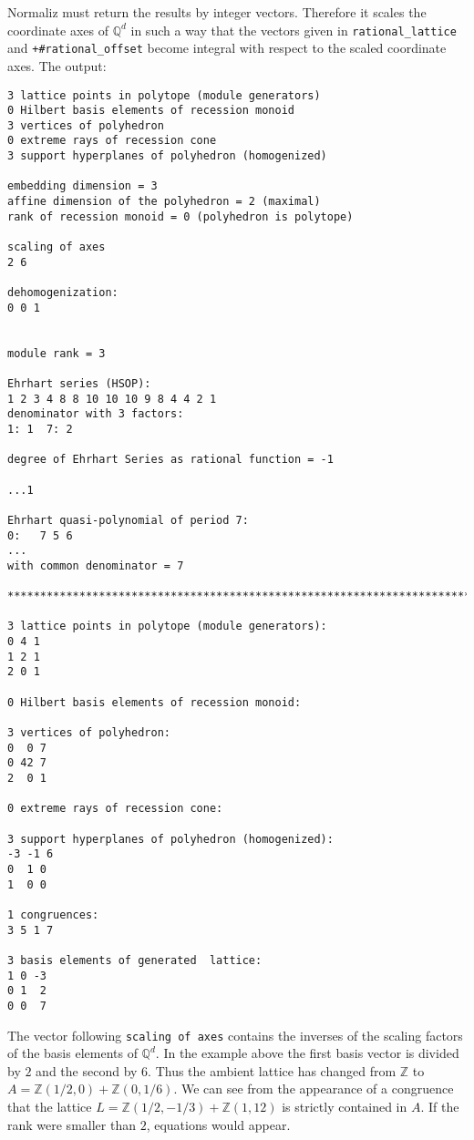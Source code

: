 \documentclass[12pt,a4paper]{scrartcl}
\theoremstyle{definition}
\def\ZZ{{\mathbb Z}}
\def\QQ{{\mathbb Q}}
\begin{document}
Normaliz must return the results by integer vectors. Therefore it scales the coordinate axes of $\QQ^d$ in such a way that the vectors given in \verb|rational_lattice| and \verb|+#rational_offset| become integral with respect to the scaled coordinate axes.
The output:
\begin{Verbatim}
3 lattice points in polytope (module generators)
0 Hilbert basis elements of recession monoid
3 vertices of polyhedron
0 extreme rays of recession cone
3 support hyperplanes of polyhedron (homogenized)

embedding dimension = 3
affine dimension of the polyhedron = 2 (maximal)
rank of recession monoid = 0 (polyhedron is polytope)

scaling of axes
2 6 

dehomogenization:
0 0 1 


module rank = 3

Ehrhart series (HSOP):
1 2 3 4 8 8 10 10 10 9 8 4 4 2 1 
denominator with 3 factors:
1: 1  7: 2  

degree of Ehrhart Series as rational function = -1

...1  

Ehrhart quasi-polynomial of period 7:
0:   7 5 6
...
with common denominator = 7

***********************************************************************

3 lattice points in polytope (module generators):
0 4 1
1 2 1
2 0 1

0 Hilbert basis elements of recession monoid:

3 vertices of polyhedron:
0  0 7
0 42 7
2  0 1

0 extreme rays of recession cone:

3 support hyperplanes of polyhedron (homogenized):
-3 -1 6
0  1 0
1  0 0

1 congruences:
3 5 1 7

3 basis elements of generated  lattice:
1 0 -3
0 1  2
0 0  7
\end{Verbatim}

The vector following \verb|scaling of axes| contains the inverses of the scaling factors of the basis elements of $\QQ^d$. In the example above the first basis vector is divided by $2$ and the second by $6$. Thus the ambient lattice has changed from $\ZZ$ to $A=\ZZ(1/2,0)+\ZZ(0,1/6)$. We can see from the appearance of a congruence that the lattice $L=\ZZ(1/2,-1/3) +\ZZ(1,12)$ is strictly contained in $A$. If the rank were smaller than $2$, equations would appear.
\end{document}
